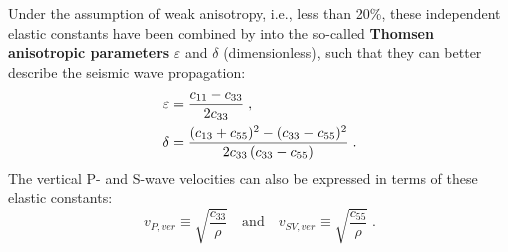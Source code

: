 Under the assumption of weak anisotropy, i.e., less than 20\%, these independent elastic constants have been combined by \citet{Thomsen:86} into the so-called \textbf{Thomsen anisotropic parameters} $\varepsilon$ and $\delta$ (dimensionless), such that they can better describe the seismic wave propagation:
\begin{subequations}
\allowdisplaybreaks
\begin{align}
    \varepsilon &= \frac{c_{11}-c_{33}}{2c_{33}}\;,\\
    \delta &= \frac{(c_{13}+c_{55})^2-(c_{33}-c_{55})^2}{2c_{33}\,(c_{33}-c_{55})}\;.
\end{align}
\end{subequations}
The vertical P- and S-wave velocities can also be expressed in terms of these elastic constants:
\begin{equation}
    v_{P,ver} \equiv \sqrt{\frac{c_{33}}{\rho}} \quad \textrm{and} \quad v_{SV,ver} \equiv \sqrt{\frac{c_{55}}{\rho}}\;.
    \label{eq:ver_vel}
\end{equation}

